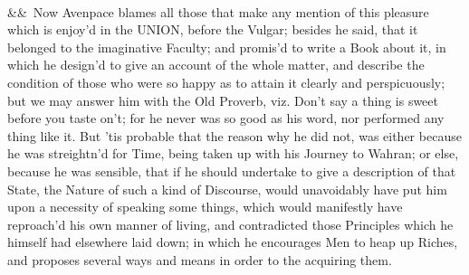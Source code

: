 \documentclass[12pt]{article}
\newcommand{\para}[1][]{\par\noindent\ifx&#1&\else\textsuperscript{\footnotesize #1}~\fi}
\begin{document}
\para Now Avenpace blames all those that make any mention of this pleasure which is enjoy'd in the UNION, before the Vulgar; besides he said, that it belonged to the imaginative Faculty; and promis'd to write a Book about it, in which he design'd to give an account of the whole matter, and describe the condition of those who were so happy as to attain it clearly and perspicuously; but we may answer him with the Old Proverb, viz. Don't say a thing is sweet before you taste on't; for he never was so good as his word, nor performed any thing like it. But 'tis probable that the reason why he did not, was either because he was streightn'd for Time, being taken up with his Journey to Wahran; or else, because he was sensible, that if he should undertake to give a description of that State, the Nature of such a kind of Discourse, would unavoidably have put him upon a necessity of speaking some things, which would manifestly have reproach'd his own manner of living, and contradicted those Principles which he himself had elsewhere laid down; in which he encourages Men to heap up Riches, and proposes several ways and means in order to the acquiring them.
\end{document}
